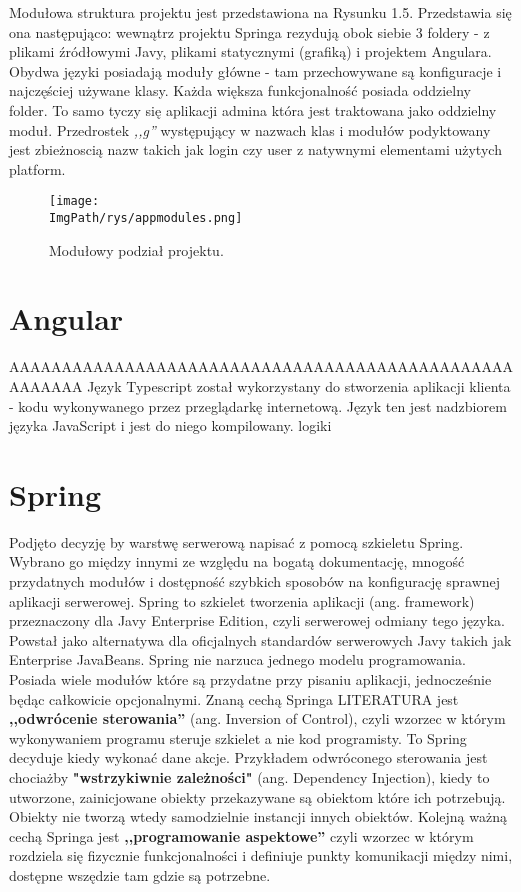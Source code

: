 \documentclass[a4paper,12pt,twoside,openany]{report}
\newcommand{\ImgPath}{.}
\begin{document}
Modułowa struktura projektu jest przedstawiona na Rysunku 1.5. Przedstawia się ona następująco: wewnątrz projektu Springa rezydują obok siebie 3 foldery - z plikami źródłowymi Javy, plikami statycznymi (grafiką) i projektem Angulara. Obydwa języki posiadają moduły główne - tam przechowywane są konfiguracje i najczęściej używane klasy. Każda większa funkcjonalność posiada oddzielny folder. To samo tyczy się aplikacji admina która jest traktowana jako oddzielny moduł. Przedrostek \textit{,,g''} występujący w nazwach klas i modułów podyktowany jest zbieżnoscią nazw takich jak login czy user z natywnymi elementami użytych platform.
		\begin{figure}[!htbp]
			\begin{center}
				\centering
				\texttt{[image: \\ImgPath/rys/appmodules.png]}
			\end{center}
			\caption{Modułowy podział projektu.}
			\label{UMLTS}
		\end{figure}
\chapter{Angular}
AAAAAAAAAAAAAAAAAAAAAAAAAAAAAAAAAAAAAAAAAAAAAAAAAAAAAAA
Język Typescript został wykorzystany do stworzenia aplikacji klienta - kodu wykonywanego przez przeglądarkę internetową. Język ten jest nadzbiorem języka JavaScript i jest do niego kompilowany. logiki 
\chapter{Spring}
Podjęto decyzję by warstwę serwerową napisać z pomocą szkieletu Spring. Wybrano go między innymi ze względu na bogatą dokumentację, mnogość przydatnych modułów i dostępność szybkich sposobów na konfigurację sprawnej aplikacji serwerowej.
Spring to szkielet tworzenia aplikacji (ang. framework) przeznaczony dla Javy Enterprise Edition, czyli serwerowej odmiany tego języka. Powstał jako alternatywa dla oficjalnych standardów serwerowych Javy takich jak Enterprise JavaBeans. Spring nie narzuca jednego modelu programowania. Posiada wiele modułów które są przydatne przy pisaniu aplikacji, jednocześnie będąc całkowicie opcjonalnymi. Znaną cechą Springa LITERATURA jest \textbf{,,odwrócenie sterowania''} (ang. Inversion of Control), czyli wzorzec w którym wykonywaniem programu steruje szkielet a nie kod programisty. To Spring decyduje kiedy wykonać dane akcje. Przykładem odwróconego sterowania jest chociażby \textbf{"wstrzykiwnie zależności"} (ang. Dependency Injection), kiedy to utworzone, zainicjowane obiekty przekazywane są obiektom które ich potrzebują. Obiekty nie tworzą wtedy samodzielnie instancji innych obiektów. Kolejną ważną cechą Springa jest \textbf{,,programowanie aspektowe''} czyli wzorzec w którym rozdziela się fizycznie funkcjonalności i definiuje punkty komunikacji między nimi, dostępne wszędzie tam gdzie są potrzebne.
\end{document}
